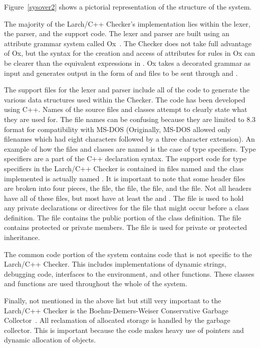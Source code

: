 \noindent Figure~\ref{sysover2} shows a pictorial representation of the
structure of the system.

The majority of the Larch/C++ Checker's implementation lies within the
lexer, the parser, and the support code. The lexer and parser are
built using an attribute grammar system called Ox~\cite{Ox}. The
Checker does not take full advantage of Ox, but the
syntax for the creation and access of attributes for rules in Ox can
be clearer than the equivalent expressions in . Ox takes a
decorated grammar as input and generates output in the form of
 and  files to be sent through  and
. 

The support files for the lexer and parser include all of the code to
generate the various data structures used within the Checker. The code
has been developed using C++. Names of the source files and classes
attempt to clearly state what they are used for. The file names can be
confusing because they are limited to 8.3 format for compatibility
with MS-DOS (Originally, MS-DOS allowed only filenames which had eight 
characters followed by a three character extension). An example of how the files and classes are named is the
case of type specifiers. Type specifiers are a part of the C++
declaration syntax. The support code for type specifiers in the
Larch/C++ Checker is contained in files named 
and the class implemented is actually named . It is
important to note that some header files are broken into four
pieces, the  file, the  file, the
 file, and the  file. Not all headers
have all of these files, but most have at least the  and
. The  file is used to hold any
private declarations or  directives for the
 file that might occur before a class definition. The
 file contains the public portion of the class definition. The
 file contains protected or private members. The
 file is used for private or protected inheritance.

The common code portion of the system contains code that is not
specific to the Larch/C++ Checker. This includes implementations of
dynamic strings, debugging code, interfaces to the environment, and
other functions. These classes and functions are used throughout the
whole of the system.

Finally, not mentioned in the above list but still very important to
the Larch/C++ Checker is the Boehm-Demers-Weiser Conservative Garbage
Collector~\cite{Boehm-Weiser88}. All reclamation of allocated storage
is handled by the garbage collector. This is important because the
code makes heavy use of pointers and dynamic allocation of objects.

